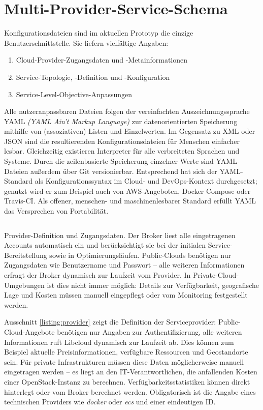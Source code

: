 \section{Multi-Provider-Service-Schema}
\label{sec:service-schema}

Konfigurationsdateien sind im aktuellen Prototyp die einzige Benutzerschnittstelle. Sie liefern vielfältige Angaben: 

\begin{enumerate}
	\item Cloud-Provider-Zugangsdaten und -Metainformationen
	\item Service-Topologie, -Definition und -Konfiguration
	\item Service-Level-Objective-Anpassungen
\end{enumerate}

Alle nutzeranpassbaren Dateien folgen der vereinfachten Auszeichnungssprache YAML \emph{(YAML Ain't Markup Language)} zur datenorientierten Speicherung mithilfe von (assoziativen) Listen und Einzelwerten. Im Gegensatz zu XML oder JSON sind die resultierenden Konfigurationsdateien für Menschen einfacher lesbar. Gleichzeitig existieren Interpreter für alle verbreiteten Sprachen und Systeme. Durch die zeilenbasierte Speicherung einzelner Werte sind YAML-Dateien außerdem über Git versionierbar. Entsprechend hat sich der YAML-Standard als Konfigurationssyntax im Cloud- und DevOps-Kontext durchgesetzt; genutzt wird er zum Beispiel auch von AWS-Angeboten, Docker Compose oder Travis-CI. Als offener, menschen- und maschinenlesbarer Standard erfüllt YAML das Versprechen von Portabilität.

\begin{listing}[ht]	
	\inputminted[]{yaml}{./src/provider.sample.yaml}
	\caption{Provider-Definition und Zugangsdaten. Der Broker liest alle eingetragenen Accounts automatisch ein und berücksichtigt sie bei der initialen Service-Bereitstellung sowie in Optimierungsläufen. Public-Clouds benötigen nur Zugangsdaten wie Benutzername und Passwort -- alle weiteren Informationen erfragt der Broker dynamisch zur Laufzeit vom Provider. In Private-Cloud-Umgebungen ist dies nicht immer möglich: Details zur Verfügbarkeit, geografische Lage und Kosten müssen manuell eingepflegt oder vom Monitoring festgestellt werden.}
	\label{listing:provider}
\end{listing}

Ausschnitt \ref{listing:provider} zeigt die Definition der Serviceprovider: Public-Cloud-Angebote benötigen nur Angaben zur Authentifizierung, alle weiteren Informationen ruft Libcloud dynamisch zur Laufzeit ab. Dies können zum Beispiel aktuelle Preisinformationen, verfügbare Ressourcen und Geostandorte sein. Für private Infrastrukturen müssen diese Daten möglicherweise manuell eingetragen werden -- es liegt an den IT-Verantwortlichen, die anfallenden Kosten einer OpenStack-Instanz zu berechnen. Verfügbarkeitsstatistiken können direkt hinterlegt oder vom Broker berechnet werden. Obligatorisch ist die Angabe eines technischen Providers wie \emph{docker} oder \emph{ecs} und einer eindeutigen ID.

